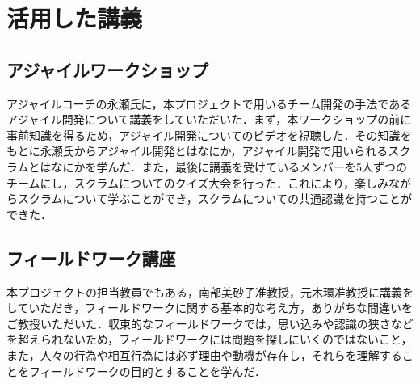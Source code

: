 \chapter{活用した講義}
\section{アジャイルワークショップ}
アジャイルコーチの永瀬氏に，本プロジェクトで用いるチーム開発の手法であるアジャイル開発について講義をしていただいた．まず，本ワークショップの前に事前知識を得るため，アジャイル開発についてのビデオを視聴した．その知識をもとに永瀬氏からアジャイル開発とはなにか，アジャイル開発で用いられるスクラムとはなにかを学んだ．また，最後に講義を受けているメンバーを5人ずつのチームにし，スクラムについてのクイズ大会を行った．これにより，楽しみながらスクラムについて学ぶことができ，スクラムについての共通認識を持つことができた．

\section{フィールドワーク講座}
本プロジェクトの担当教員でもある，南部美砂子准教授，元木環准教授に講義をしていただき，フィールドワークに関する基本的な考え方，ありがちな間違いをご教授いただいた．収束的なフィールドワークでは，思い込みや認識の狭さなどを超えられないため，フィールドワークには問題を探しにいくのではないこと，また，人々の行為や相互行為には必ず理由や動機が存在し，それらを理解することをフィールドワークの目的とすることを学んだ．

